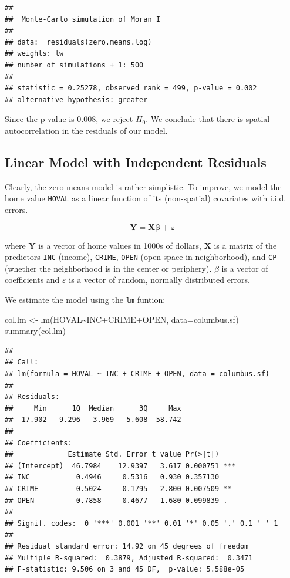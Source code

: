 \documentclass[
]{article}
\newenvironment{Shaded}{\begin{snugshade}}{\end{snugshade}}
\newcommand{\AttributeTok}[1]{\textcolor[rgb]{0.77,0.63,0.00}{#1}}
\newcommand{\FunctionTok}[1]{\textcolor[rgb]{0.00,0.00,0.00}{#1}}
\newcommand{\NormalTok}[1]{#1}
\newcommand{\OtherTok}[1]{\textcolor[rgb]{0.56,0.35,0.01}{#1}}
\newcommand{\SpecialCharTok}[1]{\textcolor[rgb]{0.00,0.00,0.00}{#1}}
\begin{document}
\begin{verbatim}
## 
##  Monte-Carlo simulation of Moran I
## 
## data:  residuals(zero.means.log) 
## weights: lw  
## number of simulations + 1: 500 
## 
## statistic = 0.25278, observed rank = 499, p-value = 0.002
## alternative hypothesis: greater
\end{verbatim}

Since the p-value is 0.008, we reject \(H_0\). We conclude that there is
spatial autocorrelation in the residuals of our model.

\hypertarget{linear-model-with-independent-residuals}{%
\subsection{Linear Model with Independent
Residuals}\label{linear-model-with-independent-residuals}}

Clearly, the zero means model is rather simplistic. To improve, we model
the home value \texttt{HOVAL} as a linear function of its (non-spatial)
covariates with i.i.d. errors.

\[
\mathbf{Y} = \mathbf{X}\mathbf{\beta} + \mathbf{\varepsilon}
\]

where \(\mathbf{Y}\) is a vector of home values in 1000s of dollars,
\(\mathbf{X}\) is a matrix of the predictors \texttt{INC} (income),
\texttt{CRIME}, \texttt{OPEN} (open space in neighborhood), and
\texttt{CP} (whether the neighborhood is in the center or periphery).
\(\beta\) is a vector of coefficients and \(\varepsilon\) is a vector of
random, normally distributed errors.

We estimate the model using the \texttt{lm} funtion:

\begin{Shaded}
\begin{Highlighting}[]
\NormalTok{col.lm }\OtherTok{\textless{}{-}} \FunctionTok{lm}\NormalTok{(HOVAL}\SpecialCharTok{\textasciitilde{}}\NormalTok{INC}\SpecialCharTok{+}\NormalTok{CRIME}\SpecialCharTok{+}\NormalTok{OPEN, }\AttributeTok{data=}\NormalTok{columbus.sf)}
\FunctionTok{summary}\NormalTok{(col.lm)}
\end{Highlighting}
\end{Shaded}

\begin{verbatim}
## 
## Call:
## lm(formula = HOVAL ~ INC + CRIME + OPEN, data = columbus.sf)
## 
## Residuals:
##     Min      1Q  Median      3Q     Max 
## -17.902  -9.296  -3.969   5.608  58.742 
## 
## Coefficients:
##             Estimate Std. Error t value Pr(>|t|)    
## (Intercept)  46.7984    12.9397   3.617 0.000751 ***
## INC           0.4946     0.5316   0.930 0.357130    
## CRIME        -0.5024     0.1795  -2.800 0.007509 ** 
## OPEN          0.7858     0.4677   1.680 0.099839 .  
## ---
## Signif. codes:  0 '***' 0.001 '**' 0.01 '*' 0.05 '.' 0.1 ' ' 1
## 
## Residual standard error: 14.92 on 45 degrees of freedom
## Multiple R-squared:  0.3879, Adjusted R-squared:  0.3471 
## F-statistic: 9.506 on 3 and 45 DF,  p-value: 5.588e-05
\end{verbatim}
\end{document}
